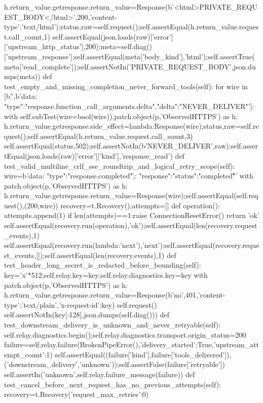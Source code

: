    h.return_value.getresponse.return_value=Response(b'<html>PRIVATE_REQUEST_BODY</html>',200,{'content-type':'text/html'});status,raw=self.request();self.assertEqual(h.return_value.request.call_count,1)
  self.assertEqual(json.loads(raw)['error']['upstream_http_status'],200);meta=self.diag()['upstream_response'];self.assertEqual(meta['body_kind'],'html');self.assertTrue(meta['read_complete']);self.assertNotIn('PRIVATE_REQUEST_BODY',json.dumps(meta))
 def test_empty_and_missing_completion_never_forward_tools(self):
  for wire in [b'',b'data: {"type":"response.function_call_arguments.delta","delta":"NEVER_DELIVER"}\n\n']:
   with self.subTest(wire=bool(wire)),patch.object(p,'ObservedHTTPS') as h:
    h.return_value.getresponse.side_effect=lambda:Response(wire);status,raw=self.request();self.assertEqual(h.return_value.request.call_count,3)
   self.assertEqual(status,502);self.assertNotIn(b'NEVER_DELIVER',raw);self.assertEqual(json.loads(raw)['error']['kind'],'response_read')
 def test_valid_multiline_crlf_sse_roundtrip_and_logical_retry_scope(self):
  wire=b'data: {"type":"response.completed",\r\ndata: "response":{"status":"completed"}}\r\n\r\n'
  with patch.object(p,'ObservedHTTPS') as h:
   h.return_value.getresponse.return_value=Response(wire);self.assertEqual(self.request(),(200,wire))
  recovery=t.Recovery();attempts=[]
  def operation():
   attempts.append(1)
   if len(attempts)==1:raise ConnectionResetError()
   return 'ok'
  self.assertEqual(recovery.run(operation),'ok');self.assertEqual(len(recovery.request_events),1)
  self.assertEqual(recovery.run(lambda:'next'),'next');self.assertEqual(recovery.request_events,[]);self.assertEqual(len(recovery.events),1)
 def test_header_long_secret_is_redacted_before_bounding(self):
  key='x'*512;self.relay.key=key;self.relay.diagnostics.key=key
  with patch.object(p,'ObservedHTTPS') as h:
   h.return_value.getresponse.return_value=Response(b'no',401,{'content-type':'text/plain','x-request-id':key})
   self.request()
  self.assertNotIn(key[:128],json.dumps(self.diag()))
 def test_downstream_delivery_is_unknown_and_never_retryable(self):
  self.relay.diagnostics.begin();self.relay.diagnostics.transport.origin_status=200
  failure=self.relay.failure(BrokenPipeError(),{'delivery_started':True,'upstream_attempt_count':1})
  self.assertEqual((failure['kind'],failure['tools_delivered']),('downstream_delivery','unknown'));self.assertFalse(failure['retryable'])
  self.assertIn('unknown',self.relay.failure_message(failure))
 def test_cancel_before_next_request_has_no_previous_attempts(self):
  recovery=t.Recovery({'request_max_retries':0})
